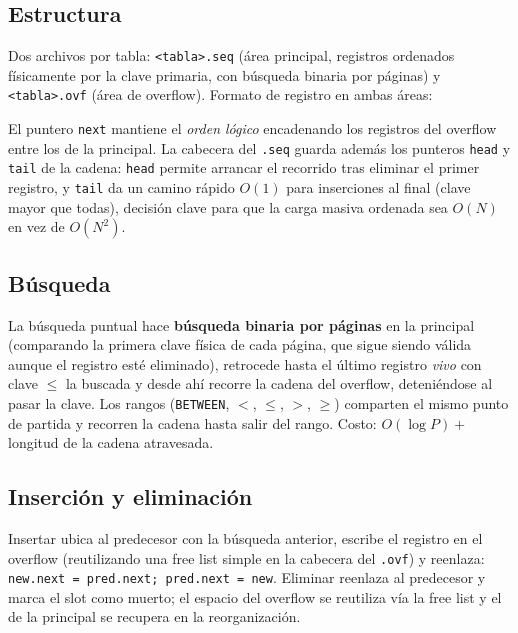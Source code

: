 \documentclass[11pt]{article}
\begin{document}
\subsection{Estructura}

Dos archivos por tabla: \texttt{<tabla>.seq} (área principal, registros
ordenados físicamente por la clave primaria, con búsqueda binaria por
páginas) y \texttt{<tabla>.ovf} (área de overflow). Formato de registro en
ambas áreas:

\begin{cajaformato}
\end{cajaformato}

El puntero \texttt{next} mantiene el \emph{orden lógico} encadenando los
registros del overflow entre los de la principal. La cabecera del
\texttt{.seq} guarda además los punteros \texttt{head} y \texttt{tail} de la
cadena: \texttt{head} permite arrancar el recorrido tras eliminar el primer
registro, y \texttt{tail} da un camino rápido $O(1)$ para inserciones al
final (clave mayor que todas), decisión clave para que la carga masiva
ordenada sea $O(N)$ en vez de $O(N^2)$.

\subsection{Búsqueda}

La búsqueda puntual hace \textbf{búsqueda binaria por páginas} en la
principal (comparando la primera clave física de cada página, que sigue
siendo válida aunque el registro esté eliminado), retrocede hasta el último
registro \emph{vivo} con clave $\le$ la buscada y desde ahí recorre la
cadena del overflow, deteniéndose al pasar la clave. Los rangos
(\texttt{BETWEEN}, $<$, $\le$, $>$, $\ge$) comparten el mismo punto de
partida y recorren la cadena hasta salir del rango. Costo:
$O(\log P) + $ longitud de la cadena atravesada.

\subsection{Inserción y eliminación}

Insertar ubica al predecesor con la búsqueda anterior, escribe el registro
en el overflow (reutilizando una free list simple en la cabecera del
\texttt{.ovf}) y reenlaza: \texttt{new.next = pred.next; pred.next = new}.
Eliminar reenlaza al predecesor y marca el slot como muerto; el espacio del
overflow se reutiliza vía la free list y el de la principal se recupera en
la reorganización.
\end{document}
